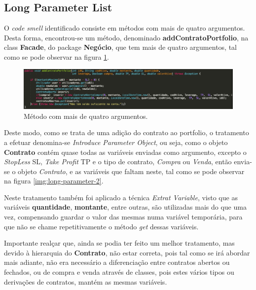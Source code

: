 \subsection{Long Parameter List}

\hspace{5mm} O \emph{code smell} identificado consiste em métodos com mais de quatro argumentos. Desta forma, encontrou-se um método, denominado \textbf{addContratoPortfolio}, na class \textbf{Facade}, do package \textbf{Negócio}, que tem mais de quatro argumentos, tal como se pode observar na figura \ref{img:long-parameter-1}. 

\begin{figure}[H]
	\centering
	\includegraphics[scale=0.45]{images/bloaters/long-parameters/long-parameters-1.png}
	\caption{Método com mais de quatro argumentos.}
	\label{img:long-parameter-1}
\end{figure}

\hspace{5mm}Deste modo, como se trata de uma adição do contrato ao portfolio, o tratamento a efetuar denomina-se \emph{Introduce Parameter Object}, ou seja, como o objeto \textbf{Contrato} contém quase todas as variáveis enviadas como argumento, excepto o \emph{StopLess} \- SL, \emph{Take Profit} \-TP e o tipo de contrato, \emph{Compra} ou \emph{Venda}, então envia-se o objeto \emph{Contrato}, e as variáveis que faltam neste, tal como se pode observar na figura \ref{img:long-parameter-2}.

\hspace{5mm} Neste tratamento também foi aplicado a técnica \emph{Extrat Variable}, visto que as variáveis \textbf{quantidade}, \textbf{montante}, entre outras, são utilizadas mais do que uma vez, compensando guardar o valor das mesmas numa variável temporária, para que não se chame repetitivamente o método \emph{get} dessas variáveis. 

\hspace{5mm} Importante realçar que, ainda se podia ter feito um melhor tratamento, mas devido à hierarquia do \textbf{Contrato}, não estar correta, pois tal como se irá abordar mais adiante, não era necessário a diferenciação entre contratos abertos ou fechados, ou de compra e venda através de classes, pois estes vários tipos ou derivações de contratos, mantém as mesmas variáveis. 

